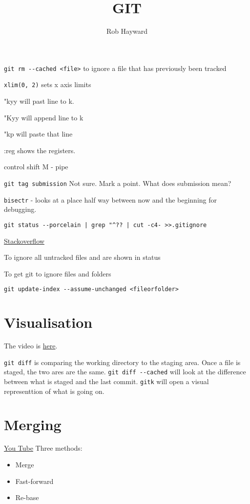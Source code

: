 \documentclass[11pt]{article} %
\title{GIT}
\author{Rob Hayward}
\begin{document}
\maketitle

\lstinline{git rm --cached <file>}  to ignore a file that has previously been tracked

\lstinline{xlim(0, 2)}  sets x axis limits

"kyy will past line to k.  

"Kyy will append line to k

"kp will paste that line

:reg shows the registers. 

control shift M - pipe

\lstinline{git tag submission}  Not sure.  Mark a point. What does submission mean? 

\lstinline{bisectr} - looks at a place half way between now and the beginning for debugging.

\lstinline{git status --porcelain | grep "^?? | cut -c4- >>.gitignore}

\href{http://stackoverflow.com/questions/11542687/git-how-to-ignore-all-present-untracked-files}{Stackoverflow}

To ignore all untracked files and are shown in status

To get git to ignore files and folders

\lstinline{git update-index --assume-unchanged <fileorfolder>}

\section{Visualisation}
The video is \href{https://www.youtube.com/watch?v=sGORc1eOVyE&feature=em-subs_digest}{here}. 

\lstinline{git diff} is comparing the working directory to the staging area. Once a file is staged, the two ares are the same. \lstinline{git diff --cached} will look at the difference between what is staged and the last commit. \lstinline{gitk} will open a visual representtion of what  is going on.  

\section{Merging}
\href{https://www.youtube.com/watch?v=to6tIdy5rNc&feature=em-subs_digest-wl}{You Tube}
Three methods:
\begin{itemize}
\item Merge
\item Fast-forward
\item Re-base
\end{itemize}
\end{document}
